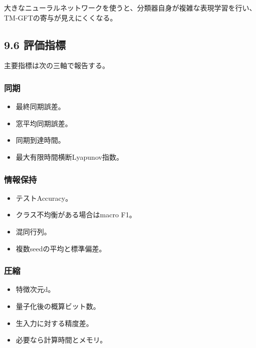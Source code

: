 \documentclass[11pt,a4paper]{ltjsarticle}
\begin{document}
大きなニューラルネットワークを使うと、分類器自身が複雑な表現学習を行い、TM-GFTの寄与が見えにくくなる。\par

\subsection*{\textcolor{researchblue}{9.6 評価指標}}

主要指標は次の三軸で報告する。\par

\subsubsection*{\textcolor{researchteal}{同期}}

\begin{itemize}

\item 最終同期誤差。

\item 窓平均同期誤差。

\item 同期到達時間。

\item 最大有限時間横断Lyapunov指数。

\end{itemize}

\subsubsection*{\textcolor{researchteal}{情報保持}}

\begin{itemize}

\item テストAccuracy。

\item クラス不均衡がある場合はmacro F1。

\item 混同行列。

\item 複数seedの平均と標準偏差。

\end{itemize}

\subsubsection*{\textcolor{researchteal}{圧縮}}

\begin{itemize}

\item 特徴次元d。

\item 量子化後の概算ビット数。

\item 生入力に対する精度差。

\item 必要なら計算時間とメモリ。

\end{itemize}
\end{document}
